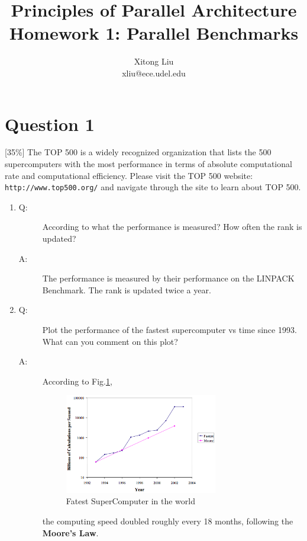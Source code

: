 \documentclass[12pt]{article}
\title{Principles of Parallel Architecture\\
Homework 1: Parallel Benchmarks}
\author{Xitong Liu \\
xliu@ece.udel.edu}
\begin{document}
\maketitle

\section{Question 1}
[35\%] The TOP 500 is a widely recognized organization that lists the 500 
supercomputers with the most performance in terms of absolute computational 
rate and computational efficiency. Please visit the TOP 500 website: 
\texttt{http://www.top500.org/} and navigate through the site to learn about 
TOP 500.

\begin{enumerate}

\item
\begin{description}
\item[Q: ]According to what the performance is measured? How often the 
rank is updated?
\item[A:]The performance is measured by their performance on the LINPACK 
Benchmark. The rank is updated twice a year.
\end{description}

\item
\begin{description}
\item[Q: ]Plot the performance of the fastest supercomputer vs time since 
1993. What can you comment on this plot?
\item[A: ]According to Fig.\ref{fig:fatest}, 
\begin{figure}[h!]
	\begin{center}
		\includegraphics[width=0.7\textwidth, angle=0]{fatest.png}
		\caption{\label{fig:fatest}Fatest SuperComputer in the world}
	\end{center}
\end{figure}
the computing speed doubled roughly every 18 months, following 
the \textbf{Moore's Law}.
\end{description}


\end{enumerate}
\end{document}
